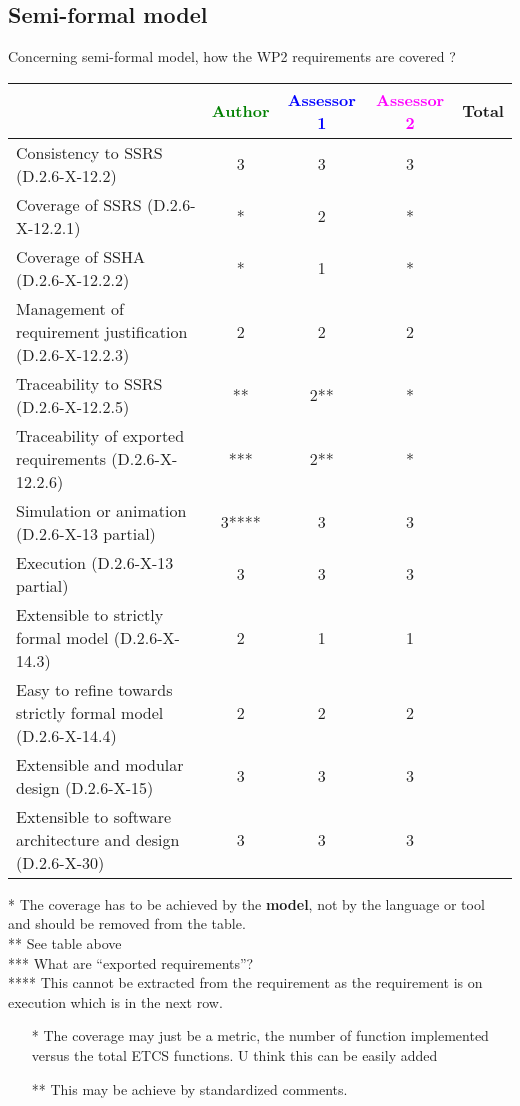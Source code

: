 \subsection{Semi-formal model}

Concerning semi-formal model, how the WP2 requirements are covered ?

\begin{tabular}{|l | c | c | c | c|}
\hline
& \textcolor{green}{Author} & \textcolor{blue}{Assessor 1} & \textcolor{magenta}{Assessor 2} & Total \\
\hline
Consistency to SSRS (D.2.6-X-12.2) &3 &3 &3 & \\
\hline
Coverage of SSRS (D.2.6-X-12.2.1) &* &2 &* & \\
\hline
Coverage of SSHA (D.2.6-X-12.2.2) &* &1 &* & \\
\hline
Management of requirement justification (D.2.6-X-12.2.3) &2 &2 &2 & \\
\hline
Traceability to SSRS (D.2.6-X-12.2.5) &** &2** &* & \\
\hline
Traceability of exported requirements (D.2.6-X-12.2.6) &*** & 2**&* & \\
\hline
Simulation or animation (D.2.6-X-13 partial) &3**** & 3 &3 & \\
\hline
Execution (D.2.6-X-13 partial) &3 &3 &3 & \\
\hline
Extensible to strictly formal model (D.2.6-X-14.3) &2 &1 &1 & \\
\hline
Easy to refine towards strictly formal model (D.2.6-X-14.4) &2 &2 &2 & \\
\hline
Extensible and modular design (D.2.6-X-15) &3 &3 &3 & \\
\hline
Extensible to software architecture and design (D.2.6-X-30) &3 &3 &3 & \\
\hline
\end{tabular}

\begin{author_comment}
* The coverage has to be achieved by the \textbf{model}, not by the language or tool and should be removed from the table.\\
** See table above\\
*** What are ``exported requirements''?\\
**** This cannot be extracted from the requirement as the requirement is on execution which is in the next row.
\end{author_comment}
\begin{assessor1}
\begin{itemize}
\item[*] The coverage may just be a metric, the number of function
  implemented versus the total ETCS functions. U think this can be
  easily added
\item[**] This may be achieve by standardized comments.
\end{itemize}
\end{assessor1}

